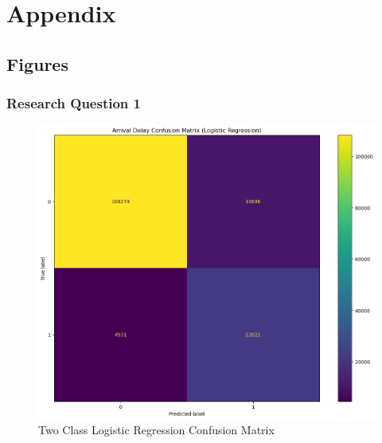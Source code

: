 \documentclass[a4paper,12pt]{article}
\begin{document}
\pagebreak

\section{Appendix}

\subsection{Figures}

\subsubsection{Research Question 1} 

\FloatBarrier

\begin{figure}[!h]
    \centering
    \includegraphics*[scale=.40]{../../img/model_rq1_cfmtrx.png}
    \caption[]{Two Class Logistic Regression Confusion Matrix}
    \label{fig:model:rq1:cfmtrx}
\end{figure}
\end{document}
